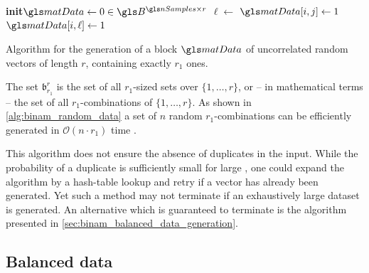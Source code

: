 \begin{algorithm}
	\small
	\begin{shaded}
		\begin{algorithmic}[1]
			\newcommand{\To}{\textbf{to}\xspace}
			\newcommand{\Init}{\State\textbf{init}\xspace}
			\Init \(\matData \gets 0 \in \B^{\nSamples \times r}\) 
			\For{ \(i \gets 1\) \To \nSamples}
				\For{ \(j \gets r - r_1 + 1\) \To \(r\)}
					\State \(\ell \gets \)  
						\State \({\matData}[i,j] \gets 1\)
					\Else
						\State \({\matData}[i,\ell] \gets 1\)
					\EndIf
				\EndFor
			\EndFor
		\end{algorithmic}
	\end{shaded}
	\caption[Uncorrelated random data generation]{Algorithm for the generation of a block $\matData$ of \nSamples uncorrelated random vectors of length $r$, containing exactly $r_1$ ones.}
	\label{alg:binam_random_data}
\end{algorithm}\ignorespaces
The set $\mathfrak{b}^r_{r_1}$ is the set of all $r_1$-sized sets over $\{1, \ldots, r\}$, or -- in mathematical terms -- the set of all $r_1$-combinations of $\{1, \ldots, r\}$. As shown in \cref{alg:binam_random_data} a set of $n$ random $r_1$-combinations can be efficiently generated in $\mathcal{O}(n \cdot r_1)$ time \cite{bentley1987programming}.

This algorithm does not ensure the absence of duplicates in the input. While the probability of a duplicate is sufficiently small for large \dimIn, one could expand the algorithm by a hash-table lookup and retry if a vector has already been generated. Yet such a method may not terminate if an exhaustively large dataset is generated. An alternative which is guaranteed to terminate is the algorithm presented in \cref{sec:binam_balanced_data_generation}.

\subsection{Balanced data}
\label{sec:binam_balanced_data}

